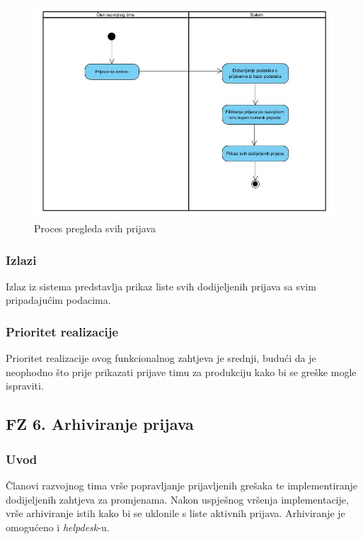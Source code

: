 \documentclass[12pt,a4paper]{article}
\begin{document}
\begin{figure}[H]
\center
\includegraphics[scale=0.5]{../res/Activity/activity5.JPG}
\caption{Proces pregleda svih prijava}
\label{act5}
\end{figure}

\subsubsection{Izlazi}

Izlaz iz sistema predstavlja prikaz liste svih dodijeljenih prijava sa svim pripadajućim podacima.

\subsubsection{Prioritet realizacije}

Prioritet realizacije ovog funkcionalnog zahtjeva je srednji, budući da je neophodno što prije prikazati prijave timu za produkciju kako bi se greške mogle ispraviti.

\newpage

\subsection{FZ 6. Arhiviranje prijava}

\subsubsection{Uvod}

Članovi razvojnog tima vrše popravljanje prijavljenih grešaka te implementiranje dodijeljenih zahtjeva za promjenama. Nakon uspješnog vršenja implementacije, vrše arhiviranje istih kako bi se uklonile s liste aktivnih prijava. Arhiviranje je omogućeno i \textit{helpdesk}-u.
\end{document}
